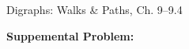 \documentclass[handout]{mcs}
\begin{document}


\begin{staffnotes}
Digraphs: Walks \& Paths, Ch. 9--9.4
\end{staffnotes}




\textbf{Suppemental Problem:}



\iffalse
\pinput{CP_covering_edges}  %
\pinput{CP_tournament_chain}
\fi


\end{document}
